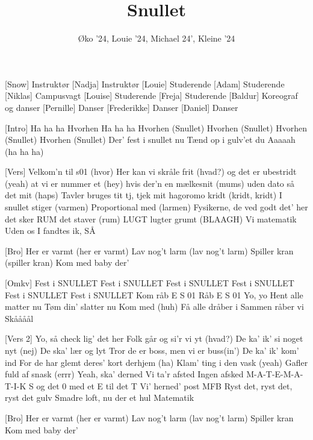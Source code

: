 \documentclass[a4paper,11pt]{article}
\title{Snullet}
\author{Øko '24, Louie '24, Michael 24', Kleine '24}
\begin{document}
\maketitle

\begin{roles}
[Snow] Instruktør
[Nadja] Instruktør
[Louie] Studerende
[Adam] Studerende
[Niklas] Campusvagt
[Louise] Studerende
[Freja] Studerende
[Baldur] Koreograf og danser
[Pernille] Danser
[Frederikke] Danser
[Daniel] Danser
\end{roles}

\begin{song}
    [Intro] Ha ha ha
Hvorhen
Ha ha ha
Hvorhen (Snullet)
Hvorhen (Snullet)
Hvorhen (Snullet)
Hvorhen (Snullet)
Der' fest i snullet nu
Tænd op i gulv'et du
Aaaaah (ha ha ha)

    [Vers] Velkom'n til s01 (hvor)
Her kan vi skråle frit (hvad?)
og det er ubestridt (yeah)
at vi er nummer et (hey)
hvis der'n en mælkesnit (mums)
uden dato så det mit (haps)
Tavler bruges tit
tj, tjek mit hagoromo kridt (kridt, kridt)
I snullet stiger (varmen)
Proportional med (larmen)
Fysikerne, de ved godt det' her det sker
RUM det staver (rum)
LUGT lugter grumt (BLAAGH)
Vi matematik
Uden os I fandtes ik, SÅ

    [Bro] Her er varmt (her er varmt)
    Lav nog't larm (lav nog't larm)
    Spiller kran (spiller kran)
    Kom med baby der'

[Omkv] Fest i SNULLET
Fest i SNULLET
Fest i SNULLET
Fest i SNULLET
Fest i SNULLET
Fest i SNULLET
Kom råb E S 01
Råb E S 01
Yo, yo
Hent alle matter nu
Tøm din' slatter nu
Kom med (huh)
Få alle dråber i
Sammen råber vi
Skåååål

[Vers 2] Yo, så check lig' det her
Folk går og si'r vi yt (hvad?)
De ka' ik' si noget nyt (nej)
De ska' lær og lyt
Tror de er boss, men vi er buss(in')
De ka' ik' kom' ind
For de har glemt deres' kort derhjem (ha)
Klam' ting i den vask (yeah)
Gafler fuld af snask (errr)
Yeah, ska' derned
Vi ta'r afsted
Ingen afsked  
M-A-T-E-M-A-T-I-K S og det 0
med et E til det T
Vi' herned' post MFB
Ryst det, ryst det, ryst det gulv
Smadre loft, nu der et hul 
 Matematik

    [Bro] Her er varmt (her er varmt)
    Lav nog't larm (lav nog't larm)
    Spiller kran 
    Kom med baby der'


\end{song}
\end{document}
